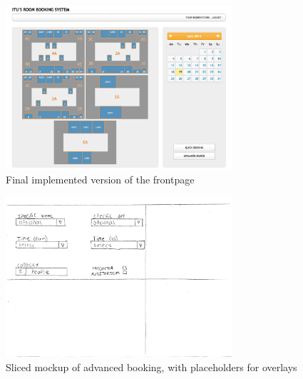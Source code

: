 \begin{figure}
\begin{center}
\leavevmode
\includegraphics[width=0.75\textwidth]{images/frontpage}
\end{center}
\caption{Final implemented version of the frontpage}
\label{fig:app1_mock3_1f}
\end{figure}

\begin{figure}
\begin{center}
\leavevmode
\includegraphics[width=0.75\textwidth]{images/adv1}
\end{center}
\caption{Sliced mockup of advanced booking, with placeholders for overlays}
\label{fig:app1_mock1_4}
\end{figure}

